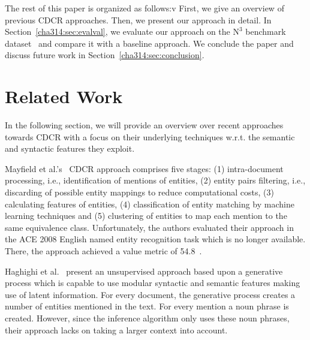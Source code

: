 The rest of this paper is organized as follows:v
First, we give an overview of previous CDCR approaches.
Then, we present our approach in detail.
In Section~\ref{cha314:sec:evalval}, we evaluate our approach on the $\mbox{N}^3$ benchmark dataset~\cite{n3} and compare it with a baseline approach.
We conclude the paper and discuss future work in Section~\ref{cha314:sec:conclusion}.



\section{Related Work}
\label{sec:sota}
In the following section, we will provide an overview over recent approaches towards CDCR with a focus on their underlying techniques w.r.t. the semantic and syntactic features they exploit.

Mayfield et al.'s~\cite{mayfield2009cross} CDCR approach comprises five stages: (1) intra-document processing, i.e., identification of mentions of entities, (2) entity pairs filtering, i.e., discarding of possible entity mappings to reduce computational costs, (3) calculating features of entities, (4) classification of entity matching by machine learning techniques and (5) clustering of entities to map each mention to the same equivalence class.
Unfortunately, the authors evaluated their approach in the ACE 2008 English named entity recognition task which is no longer available.
There, the approach achieved a value metric of 54.8~\cite{citeulike:5297302}.

Haghighi et al.~\cite{haghighi-klein:2010:NAACLHLT} present an unsupervised approach based upon a generative process which is capable to use modular syntactic and semantic features making use of latent information.
For every document, the generative process creates a number of entities mentioned in the text.
For every mention a noun phrase is created.
However, since the inference algorithm only uses these noun phrases, their approach lacks on taking a larger context into account.


